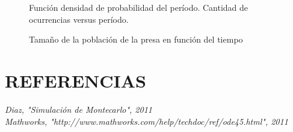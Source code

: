 \documentclass{SPANISH_acm_proc_article-sp}
\begin{document}
\begin{figure}
\centering
\label{fig:histo}
\caption{Funci\'on densidad de probabilidad del per\'iodo. Cantidad de ocurrencias versus per\'iodo.}
\end{figure}

\begin{figure}
\centering
\label{fig:presa}
\caption{Tama\~no de la poblaci\'on de la presa en funci\'on del tiempo}
\end{figure}

\section*{REFERENCIAS}
\textit{Diaz, "Simulaci\'on de Montecarlo", 2011} \\
\textit{Mathworks, "http://www.mathworks.com/help/techdoc/ref/ode45.html", 2011}
\end{document}
